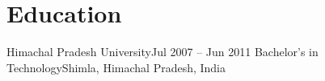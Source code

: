 \section{Education}
    \resumeSubHeadingListStart

    \resumeSubheading
    {Himachal Pradesh University}{Jul 2007 -- Jun 2011}
    {Bachelor’s in Technology}{Shimla, Himachal Pradesh, India}
   
    \resumeSubHeadingListEnd